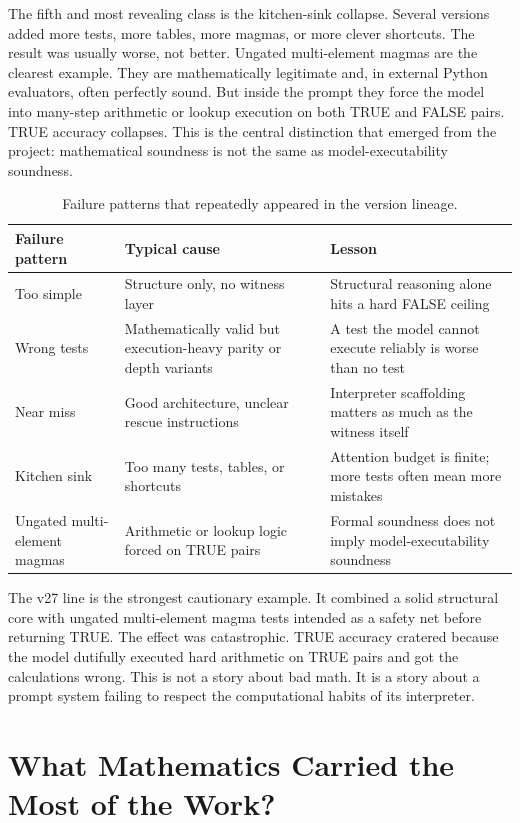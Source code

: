\documentclass[12pt]{amsart}
\begin{document}
The fifth and most revealing class is the kitchen-sink collapse. Several versions added more tests, more tables, more magmas, or more clever shortcuts. The result was usually worse, not better. Ungated multi-element magmas are the clearest example. They are mathematically legitimate and, in external Python evaluators, often perfectly sound. But inside the prompt they force the model into many-step arithmetic or lookup execution on both TRUE and FALSE pairs. TRUE accuracy collapses. This is the central distinction that emerged from the project: mathematical soundness is not the same as model-executability soundness.

\begin{table}[t]
\centering
\caption{Failure patterns that repeatedly appeared in the version lineage.}
\begin{tabular}{>{\raggedright\arraybackslash}p{1.7in} >{\raggedright\arraybackslash}p{1.8in} >{\raggedright\arraybackslash}p{2.3in}}
\toprule
Failure pattern & Typical cause & Lesson \\
\midrule
Too simple & Structure only, no witness layer & Structural reasoning alone hits a hard FALSE ceiling \\
Wrong tests & Mathematically valid but execution-heavy parity or depth variants & A test the model cannot execute reliably is worse than no test \\
Near miss & Good architecture, unclear rescue instructions & Interpreter scaffolding matters as much as the witness itself \\
Kitchen sink & Too many tests, tables, or shortcuts & Attention budget is finite; more tests often mean more mistakes \\
Ungated multi-element magmas & Arithmetic or lookup logic forced on TRUE pairs & Formal soundness does not imply model-executability soundness \\
\bottomrule
\end{tabular}
\end{table}

The v27 line is the strongest cautionary example. It combined a solid structural core with ungated multi-element magma tests intended as a safety net before returning TRUE. The effect was catastrophic. TRUE accuracy cratered because the model dutifully executed hard arithmetic on TRUE pairs and got the calculations wrong. This is not a story about bad math. It is a story about a prompt system failing to respect the computational habits of its interpreter.

\section{What Mathematics Carried the Most of the Work?}
\end{document}
